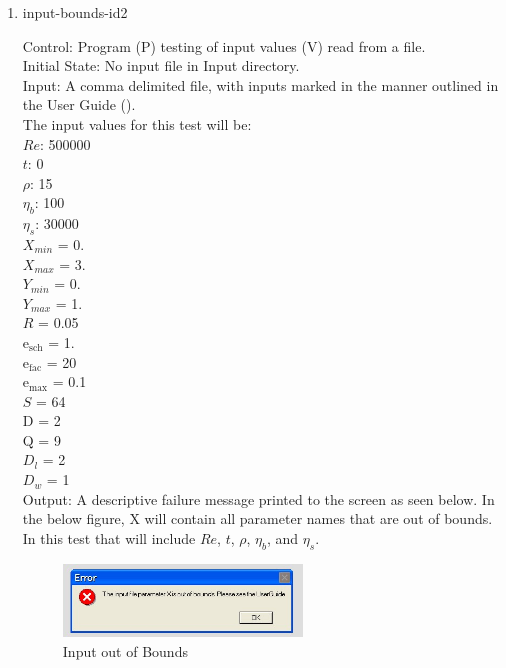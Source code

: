 \documentclass[12pt, titlepage]{article}
\begin{document}
\begin{enumerate}			
					
\item{input-bounds-id2\\}

Control: Program (P) testing of input values (V) read from a file.\\
					
Initial State: No input file in Input directory.\\
					
Input: A comma delimited file, with inputs marked in the manner outlined in the User Guide (\citet{LBM_UserGuide_PM}).\\The input values for this test will be:\\$Re$: 500000\\
$t$: 0\\
$\rho$: 15\\
$\eta_b$: 100\\
$\eta_s$: 30000\\
$X_{min}$ = 0.\\
$X_{max}$ = 3.\\
$Y_{min}$ = 0.\\
$Y_{max}$ = 1.\\
$R$ = 0.05\\
$\mathrm{e_{sch}}$ = 1.\\
$\mathrm{e_{fac}}$ = 20\\
$\mathrm{e_{max}}$ = 0.1\\
$S$ = 64\\
$\mathrm{D}$ = 2\\
$\mathrm{Q}$ = 9\\
$D_{l}$ = 2\\
$D_{w}$ = 1\\

					
Output: A descriptive failure message printed to the screen as seen below. In the below figure, X will contain all parameter names that are out of bounds. In this test that will include $Re$, $t$, $\rho$, $\eta_b$, and $\eta_s$.

\begin{figure}[h!]
\begin{center}
\includegraphics[width=0.6\textwidth]{errorMessage.jpeg}
\caption{Input out of Bounds}
\label{Fig_InputError}
\end{center}
\end{figure}


\end{enumerate}
\end{document}

